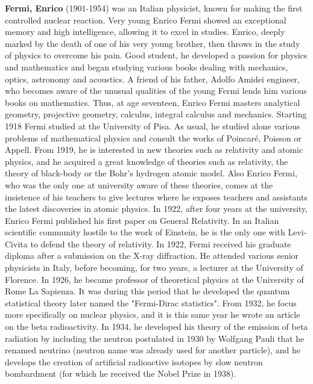 \textbf{Fermi, Enrico} (1901-1954) was an Italian physicist, known for making the first controlled nuclear reaction. Very young Enrico Fermi showed an exceptional memory and high intelligence, allowing it to excel in studies. Enrico, deeply marked by the death of one of his very young brother, then throws in the study of physics to overcome his pain. Good student, he developed a passion for physics and mathematics and began studying various books dealing with mechanics, optics, astronomy and acoustics. A friend of his father, Adolfo Amidei engineer, who becomes aware of the unusual qualities of the young Fermi lends him various books on mathematics. Thus, at age seventeen, Enrico Fermi masters analytical geometry, projective geometry, calculus, integral calculus and mechanics. Starting 1918 Fermi studied at the University of Pisa. As usual, he studied alone various problems of mathematical physics and consult the works of Poincaré, Poisson or Appell. From 1919, he is interested in new theories such as relativity and atomic physics, and he acquired a great knowledge of theories such as relativity, the theory of black-body or the Bohr's hydrogen atomic model. Also Enrico Fermi, who was the only one at university aware of these theories, comes at the insistence of his teachers to give lectures where he exposes teachers and assistants the latest discoveries in atomic physics. In 1922, after four years at the university, Enrico Fermi published his first paper on General Relativity. In an Italian scientific community hostile to the work of Einstein, he is the only one with Levi-Civita to defend the theory of relativity. In 1922, Fermi received his graduate diploma after a submission on the X-ray diffraction. He attended various senior physicists in Italy, before becoming, for two years, a lecturer at the University of Florence. In 1926, he became professor of theoretical physics at the University of Rome La Sapienza. It was during this period that he developed the quantum statistical theory later named the "Fermi-Dirac statistics". From 1932, he focus more specifically on nuclear physics, and it is this same year he wrote an article on the beta radioactivity. In 1934, he developed his theory of the emission of beta radiation by including the neutron postulated in 1930 by Wolfgang Pauli that he renamed neutrino (neutron name was already used for another particle), and he develops the creation of artificial radioactive isotopes by slow neutron bombardment (for which he received the Nobel Prize in 1938).

